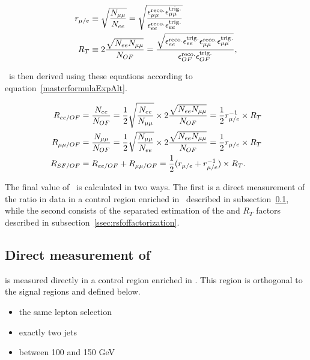 \begin{align}
  \label{eqn:rmue} r_{\mu/e} & \equiv \sqrt{\frac{N_{\mu\mu}}{N_{\relax{e}\relax{e}}}} 
  = \sqrt{\frac{\epsilon_{\mu\mu}^\mathrm{reco.}\epsilon_{\mu\mu}^\mathrm{trig.}}{\epsilon_{\relax{e}\relax{e}}^\mathrm{reco.}\epsilon_{\relax{e}\relax{e}}^\mathrm{trig.}}} \\
  \label{eqn:rt} R_T   & \equiv 2 \frac{\sqrt{N_{\relax{e}\relax{e}}N_{\mu\mu}}}{N_{OF}} 
  = \frac{\sqrt{\epsilon_{\relax{e}\relax{e}}^\mathrm{reco.}\epsilon_{\relax{e}\relax{e}}^\mathrm{trig.}\epsilon_{\mu\mu}^\mathrm{reco.}\epsilon_{\mu\mu}^\mathrm{trig.}}}{\epsilon_{OF}^\mathrm{reco.}\epsilon_{OF}^\mathrm{trig.}},
\end{align}

\rsfof\ is then derived using these equations according to equation~\ref{masterformulaExpAlt}.

\begin{align}
  \label{masterformulaExpAlt}
  R_{\relax{e}\relax{e}/OF} & = \frac{N_{\relax{e}\relax{e}}}{N_{OF}} 
  = \frac{1}{2} \sqrt{\frac{N_{\relax{e}\relax{e}}}{N_{\mu\mu}}} \times 2 \frac{\sqrt{N_{\relax{e}\relax{e}}N_{\mu\mu}}}{N_{OF}} = \frac{1}{2} r_{\mu/e}^{-1} \times R_T \notag \\
  R_{\mu\mu/OF} & = \frac{N_{\mu\mu}}{N_{OF}} 
  = \frac{1}{2} \sqrt{\frac{N_{\mu\mu}}{N_{\relax{e}\relax{e}}}} \times 2 \frac{\sqrt{N_{\relax{e}\relax{e}}N_{\mu\mu}}}{N_{OF}} = \frac{1}{2} r_{\mu/e} \times R_T \notag\\
  R_{SF/OF} & = R_{\relax{e}\relax{e}/OF}+R_{\mu\mu/OF} = \frac{1}{2} (r_{\mu/e} + r_{\mu/e}^{-1})\times R_T. 
\end{align}

The final value of \rsfof\ is calculated in two ways.
The first is a direct measurement of the ratio in data in a control region enriched in \ttbar\ described in subsection~\ref{ssec:rsfofDirect},
while the second consists of the separated estimation of the \rmue and $R_T$ factors described in subsection~\ref{ssec:rsfoffactorization}.

\subsection{Direct measurement of \rsfof}
\label{ssec:rsfofDirect}
\rsfof is measured directly in a control region enriched in \ttbar.
This region is orthogonal to the signal regions and defined below.

\begin{itemize}
\item the same lepton selection
\item exactly two jets
\item \met between 100 and 150 GeV
\end{itemize}


